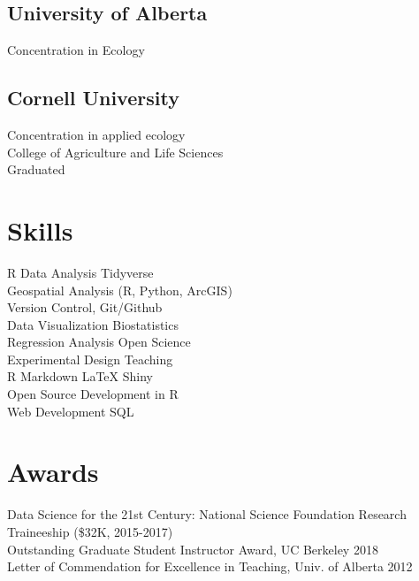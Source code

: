 \documentclass[]{deedy-resume-openfont}
\begin{document}
\begin{minipage}[t]{0.32\textwidth}
\subsection{University of Alberta}
Concentration in Ecology \\
\sectionsep

\subsection{Cornell University}
Concentration in applied ecology \\
College of Agriculture and Life Sciences \\
Graduated 
\sectionsep


\section{Skills}
\textbullet{} R \textbullet{} Data Analysis \textbullet{} Tidyverse \\\textbullet{} Geospatial Analysis (R, Python, ArcGIS) \\\textbullet{} Version Control, Git/Github \\\textbullet{} Data Visualization \textbullet{} Biostatistics \\\textbullet{} Regression Analysis \textbullet{} Open Science \\\textbullet{} Experimental Design \textbullet{} Teaching \\\textbullet{} R Markdown \textbullet{} LaTeX \textbullet{} Shiny \\\textbullet{} Open Source Development in R \\ \textbullet{} Web Development \textbullet{} SQL 
\sectionsep


\section{Awards}

\textbullet{} Data Science for the 21st Century: National Science Foundation Research Traineeship (\$32K, 2015-2017) \\
\textbullet{} Outstanding Graduate Student Instructor Award, UC Berkeley 2018\\
\textbullet{} Letter of Commendation for Excellence in Teaching, Univ. of Alberta 2012\\
\sectionsep


\end{minipage}
\end{document}
